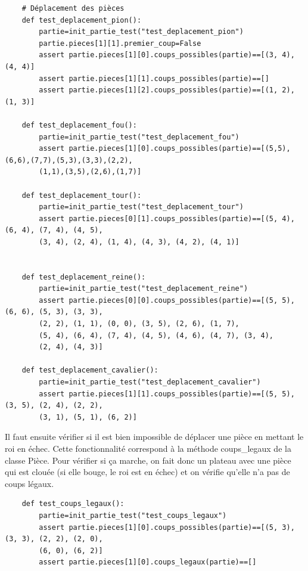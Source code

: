 \documentclass{article}
\begin{document}
\begin{verbatim}
    # Déplacement des pièces
    def test_deplacement_pion():
        partie=init_partie_test("test_deplacement_pion")
        partie.pieces[1][1].premier_coup=False
        assert partie.pieces[1][0].coups_possibles(partie)==[(3, 4), (4, 4)]
        assert partie.pieces[1][1].coups_possibles(partie)==[]
        assert partie.pieces[1][2].coups_possibles(partie)==[(1, 2), (1, 3)]
    
    def test_deplacement_fou():
        partie=init_partie_test("test_deplacement_fou")
        assert partie.pieces[1][0].coups_possibles(partie)==[(5,5),(6,6),(7,7),(5,3),(3,3),(2,2),
        (1,1),(3,5),(2,6),(1,7)]
                
    def test_deplacement_tour():
        partie=init_partie_test("test_deplacement_tour")
        assert partie.pieces[0][1].coups_possibles(partie)==[(5, 4), (6, 4), (7, 4), (4, 5), 
        (3, 4), (2, 4), (1, 4), (4, 3), (4, 2), (4, 1)]
    
    
    def test_deplacement_reine():
        partie=init_partie_test("test_deplacement_reine")
        assert partie.pieces[0][0].coups_possibles(partie)==[(5, 5), (6, 6), (5, 3), (3, 3), 
        (2, 2), (1, 1), (0, 0), (3, 5), (2, 6), (1, 7), 
        (5, 4), (6, 4), (7, 4), (4, 5), (4, 6), (4, 7), (3, 4), 
        (2, 4), (4, 3)]
    
    def test_deplacement_cavalier():   
        partie=init_partie_test("test_deplacement_cavalier")
        assert partie.pieces[1][1].coups_possibles(partie)==[(5, 5), (3, 5), (2, 4), (2, 2), 
        (3, 1), (5, 1), (6, 2)]
\end{verbatim}


Il faut ensuite vérifier si il est bien impossible de déplacer une pièce en mettant le roi en échec. 
Cette fonctionnalité correspond à la méthode coups\_legaux de la classe Pièce. 
Pour vérifier si ça marche, on fait donc un plateau avec une pièce qui est clouée (si elle bouge, le roi est en échec) et on vérifie qu'elle n'a pas de coups légaux.

\begin{verbatim}
    def test_coups_legaux():
        partie=init_partie_test("test_coups_legaux")
        assert partie.pieces[1][0].coups_possibles(partie)==[(5, 3), (3, 3), (2, 2), (2, 0), 
        (6, 0), (6, 2)]
        assert partie.pieces[1][0].coups_legaux(partie)==[]
\end{verbatim}
\end{document}
